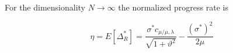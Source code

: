 


For the dimensionality $N \rightarrow \infty$ the normalized progress rate \cite{1284729} is 

$$
\eta = E[ \Delta_R^*] = \frac{\sigma^* c_{\mu / \mu, \lambda}}{\sqrt {1+ \vartheta^2}} - \frac{(\sigma^*)^2}{2 \mu}
$$

